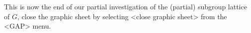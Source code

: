 This  is now  the end of   our partial investigation  of the (partial)
subgroup lattice  of $G$, close  the graphic sheet by selecting <close
graphic sheet> from the <GAP> menu.


%
%
%
%
%
%
%
%
%
%
%
%


